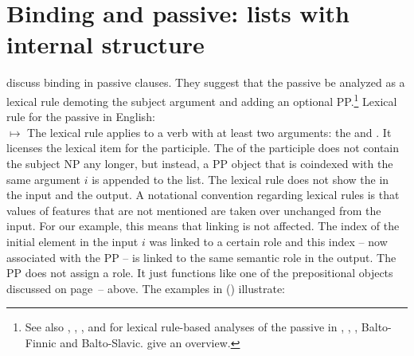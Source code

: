 \documentclass[output=paper,biblatex,babelshorthands,newtxmath,draftmode,colorlinks,citecolor=brown]{langscibook}
\begin{document}
\section{Binding and passive: \texorpdfstring{\argst}{ARG-ST} lists with internal structure}
\label{binding-sec-passive}



\citet{MS98a} discuss binding in passive clauses. They suggest that the passive be analyzed as a
lexical rule demoting the subject argument and adding an optional PP.\footnote{
  See also , , , and  for lexical rule-based analyses of the
  passive in 
, , , Balto-Finnic and Balto-Slavic.  give an overview.
} 
\ea
Lexical rule for the passive in English:\\
$\mapsto$
\z
The lexical rule applies to a verb with at least two arguments: the \NPi and . It licenses
the lexical item for the participle. The \argstl of the participle does not contain the subject NP
any longer, but instead, a PP object that is coindexed with the same argument $i$ is appended to the list. 
The lexical rule does not show the \contv in the input and the output. A notational convention
regarding lexical rules is that values of features that are not mentioned are taken over unchanged
from the input. For our example, this means that linking is not affected. The index of the initial
element in the input $i$ was linked to a certain role and this index -- now associated with the PP
-- is linked to the same semantic role in the output. The PP does not assign a role. It just
functions like one of the prepositional objects discussed on
page~\pageref{binding:page-prepositional-objects-start}--\pageref{binding:page-prepositional-objects-end}
above. The examples in () illustrate:
\end{document}
